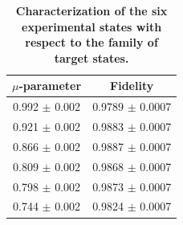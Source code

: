 \documentclass[aps,prx,twocolumn,superscriptaddress]{revtex4-1}
\theoremstyle{plain}
\begin{document}
\begin{table}[htb]
    \centering
    \begin{tabular}{|c|c|}
        \hline
        $\mu$-parameter   & Fidelity  \\ \hline
        0.992 $\pm$ 0.002 & 0.9789 $\pm$ 0.0007\\ \hline
        0.921 $\pm$ 0.002 & 0.9883 $\pm$ 0.0007\\ \hline
        0.866 $\pm$ 0.002 & 0.9887 $\pm$ 0.0007\\ \hline
        0.809 $\pm$ 0.002 & 0.9868 $\pm$ 0.0007\\\hline
        0.798 $\pm$ 0.002 & 0.9873 $\pm$ 0.0007\\ \hline
        0.744 $\pm$ 0.002 & 0.9824 $\pm$ 0.0007\\ \hline
    \end{tabular}
    \caption{\bf{Characterization of the six experimental states with respect to the family of target states.}}
    \label{tab:state quality}
\end{table}
\end{document}
